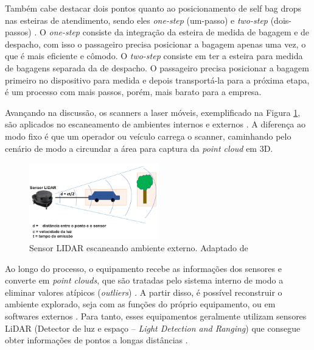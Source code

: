     
    Também cabe destacar dois pontos quanto ao posicionamento de self bag drops nas esteiras de atendimento, sendo eles \textit{one-step} (um-passo) e \textit{two-step} (dois-passos) \cite{neale_2017_automated}. O \textit{one-step} consiste da integração da esteira de medida de bagagem e de despacho, com isso o passageiro precisa posicionar a bagagem apenas uma vez, o que é mais eficiente e cômodo. O \textit{two-step} consiste em ter a esteira para medida de bagagens separada da de despacho. O passageiro precisa posicionar a bagagem primeiro no dispositivo para medida e depois transportá-la para a próxima etapa, é um processo com mais passos, porém, mais barato para a empresa. 
    
    Avançando na discussão, os scanners a laser móveis, exemplificado na Figura \ref{fig:Sensor LIDAR escaneando ambiente externo}, são aplicados no escaneamento de ambientes internos e externos \cite{zhang_2018_a}. A diferença ao modo fixo é que um operador ou veículo carrega o scanner, caminhando pelo cenário de modo a circundar a área para captura da \textit{point cloud} em 3D. 
    
        \begin{figure}[h]
           \centering
           \includegraphics[width=0.5\textwidth]{imagens/Lidar_Sensor_metod.png} 
           \caption{Sensor LIDAR escaneando ambiente externo. Adaptado de \cite{mathworks_2022_introduction}}
           \label{fig:Sensor LIDAR escaneando ambiente externo}
        \end{figure}

    Ao longo do processo, o equipamento recebe as informações dos sensores e converte em \textit{point clouds}, que são tratadas pelo sistema interno de modo a eliminar valores atípicos (\textit{outliers}) \cite{xu_2021_lidar}. A partir disso, é possível reconstruir o ambiente explorado, seja com as funções do próprio equipamento, ou em softwares externos \cite{xu_2021_lidar, zhang_2018_a}. Para tanto, esses equipamentos geralmente utilizam sensores LiDAR (Detector de luz e espaço – \textit{Light Detection and Ranging}) que consegue obter informações de pontos a longas distâncias \cite{zhou_2019_extracting}.


